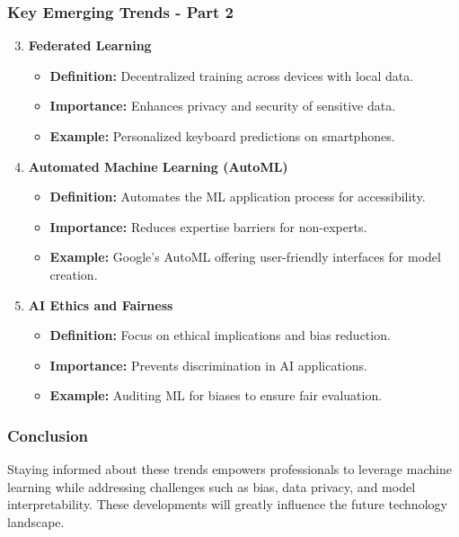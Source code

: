 \documentclass[aspectratio=169]{beamer}
\begin{document}
\begin{frame}[fragile]
    \frametitle{Key Emerging Trends - Part 2}
    \begin{enumerate}
        \setcounter{enumi}{2} %
        \item \textbf{Federated Learning}
            \begin{itemize}
                \item \textbf{Definition:} Decentralized training across devices with local data.
                \item \textbf{Importance:} Enhances privacy and security of sensitive data.
                \item \textbf{Example:} Personalized keyboard predictions on smartphones.
            \end{itemize}

        \item \textbf{Automated Machine Learning (AutoML)}
            \begin{itemize}
                \item \textbf{Definition:} Automates the ML application process for accessibility.
                \item \textbf{Importance:} Reduces expertise barriers for non-experts.
                \item \textbf{Example:} Google's AutoML offering user-friendly interfaces for model creation.
            \end{itemize}

        \item \textbf{AI Ethics and Fairness}
            \begin{itemize}
                \item \textbf{Definition:} Focus on ethical implications and bias reduction.
                \item \textbf{Importance:} Prevents discrimination in AI applications.
                \item \textbf{Example:} Auditing ML for biases to ensure fair evaluation.
            \end{itemize}
    \end{enumerate}
\end{frame}

\begin{frame}[fragile]
    \frametitle{Conclusion}
    Staying informed about these trends empowers professionals to leverage machine learning while addressing challenges such as bias, data privacy, and model interpretability. These developments will greatly influence the future technology landscape.
\end{frame}
\end{document}
